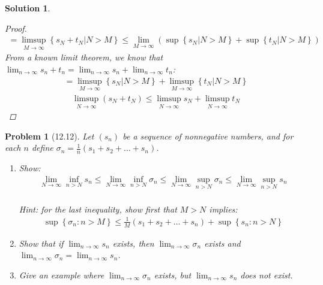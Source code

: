 \documentclass[12pt]{article}
\newtheorem{problem}{Problem}
\newtheorem{solution}{Solution}
\begin{document}
\begin{solution}
\begin{proof}
        \begin{align}
            =\limsup_{M \to \infty} \left\{ s_{N} +t_{N} |N>M \right\} \leq \lim_{M \to \infty} (\sup \left\{ s_{N} |N>M \right\} +\sup  \left\{ t_{N} |N>M \right\} )
        \end{align}
        From a known limit theorem, we know that $\lim_{n \to \infty} s_{n} +t_{n} =\lim_{n \to \infty} s_{n} +\lim_{n \to \infty} t_{n} $: 
        \begin{align}
            =\limsup_{M \to \infty} \left\{ s_{N} |N>M \right\} +\limsup_{M \to \infty} \left\{ t_{N} |N>M \right\} 
        \end{align}
        \begin{align}
            \limsup_{N \to \infty} (s_{N} +t_{N} )\leq \limsup_{N \to \infty} s_{N} + \limsup_{N \to \infty} t_{N} 
        \end{align}
   \end{proof} 
\end{solution}

\begin{problem}[12.12]
   Let $(s_{n} )$ be a sequence of nonnegative numbers, and for each $n$ define $\sigma_n=\frac{1}{n}(s_1 +s_2 +\dots +s_n )$.
   \begin{enumerate}
    \item Show:
    \begin{align}
       \lim_{N \to \infty} \inf_{n>N}s_n \leq \lim_{N \to \infty} \inf_{n>N} \sigma_n \leq \lim_{N \to \infty} \sup_{n>N} \sigma_n \leq \lim_{N \to \infty} \sup_{n>N} s_n
    \end{align}\\
    Hint: for the last inequality, show first that $M>N$ implies:
    \begin{align}
        \sup \left\{ \sigma_n:n>M \right\} \leq \frac{1}{M}(s_1 +s_2 + \dots +s_n)+\sup \left\{ s_n:n>N \right\}
    \end{align}
    \item Show that if $\lim_{n \to \infty} s_n$ exists, then $\lim_{n \to \infty} \sigma_n$ exists and $\lim_{n \to \infty} \sigma_n=\lim_{n \to \infty} s_n$.  
    \item Give an example where $\lim_{n \to \infty} \sigma_n$ exists, but $\lim_{n \to \infty} s_{n} $ does not exist.  
   \end{enumerate}   
\end{problem}
\end{document}
